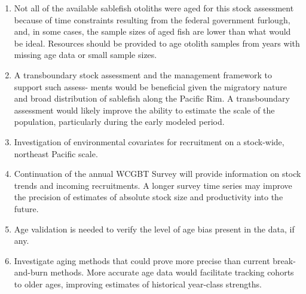\documentclass[11pt,
  english,
  a4paper,
]{article}
\begin{document}
\begin{enumerate}
\def\labelenumi{\arabic{enumi}.}
\item

  Not all of the available sablefish otoliths were aged for this stock assessment because of time constraints resulting from the federal government furlough, and, in some cases, the sample sizes of aged fish are lower than what would be ideal. Resources should be provided to age otolith samples from years with missing age data or small sample sizes.

  \leavevmode\tagmcend\tagstructend\par
\item

  A transboundary stock assessment and the management framework to support such assess- ments would be beneficial given the migratory nature and broad distribution of sablefish along the Pacific Rim. A transboundary assessment would likely improve the ability to estimate the scale of the population, particularly during the early modeled period.

  \leavevmode\tagmcend\tagstructend\par
\item

  Investigation of environmental covariates for recruitment on a stock-wide, northeast Pacific scale.

  \leavevmode\tagmcend\tagstructend\par
\item

  Continuation of the annual WCGBT Survey will provide information on stock trends and incoming recruitments. A longer survey time series may improve the precision of estimates of absolute stock size and productivity into the future.

  \leavevmode\tagmcend\tagstructend\par
\item

  Age validation is needed to verify the level of age bias present in the data, if any.

  \leavevmode\tagmcend\tagstructend\par
\item

  Investigate aging methods that could prove more precise than current break-and-burn methods. More accurate age data would facilitate tracking cohorts to older ages, improving estimates of historical year-class strengths.


\end{enumerate}
\end{document}
